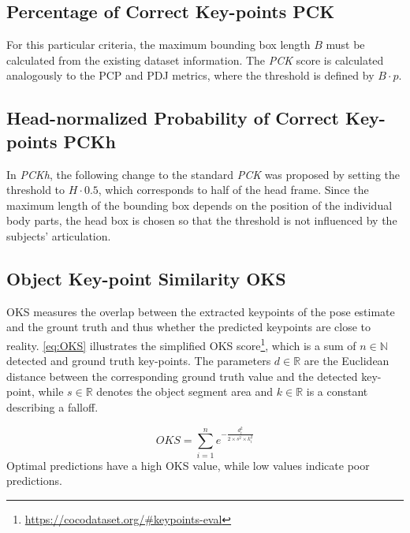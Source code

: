 \subsection{Percentage of Correct Key-points PCK}
For this particular criteria, the maximum bounding box length $B$ must be calculated from the existing dataset information. The \emph{PCK} score is calculated analogously to the PCP and PDJ metrics, where the threshold is defined by $B \cdot p$. \cite{pck}

\subsection{Head-normalized Probability of Correct Key-points PCKh}
In \emph{PCKh}, the following change to the standard \emph{PCK} was proposed by setting the threshold to $H \cdot 0.5$, which corresponds to half of the head frame. Since the maximum length of the bounding box depends on the position of the individual body parts, the head box is chosen so that the threshold is not influenced by the subjects' articulation. \cite{mpii}



\subsection{Object Key-point Similarity OKS}
OKS measures the overlap between the extracted keypoints of the pose estimate and the grount truth and thus whether the predicted keypoints are close to reality.
\autoref{eq:OKS} illustrates the simplified OKS score\footnote{\url{https://cocodataset.org/\#keypoints-eval}}, which is a sum of $ n \in \mathbb{N}$ detected and ground truth key-points. The parameters $d \in \mathbb{R}$ are the Euclidean distance between the corresponding ground truth value and the detected key-point, while $s \in \mathbb{R}$ denotes the object segment area and $k \in \mathbb{R}$ is a constant describing a falloff. 

\begin{equation}
    \label{eq:OKS}
    OKS = \sum_{i=1}^{n} e^{- \frac{d_{i}^{2}}{2 \times s^{2} \times k_{i}^{2}}}
\end{equation}
Optimal predictions have a high OKS value, while low values indicate poor predictions. 

